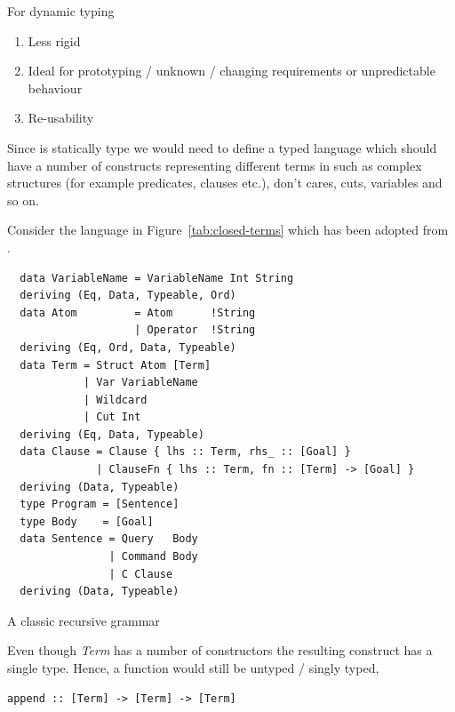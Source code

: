 \documentclass[thesis-solanki.tex]{subfiles}
\begin{document}
For dynamic typing
\begin{enumerate}
\item Less rigid
\item Ideal for prototyping / unknown / changing requirements or unpredictable behaviour
\item Re-usability
\end{enumerate}

Since  is statically type we would need to define a typed language which should have a
number of constructs representing different terms in  such as complex structures (for example
predicates, clauses etc.), don't cares, cuts, variables and so on.

Consider the language {in Figure~\ref{tab:closed-terms}} which has been adopted from
\cite{prolog-lib}.

\begin{code-list}
\begin{verbatim}
  data VariableName = VariableName Int String
  deriving (Eq, Data, Typeable, Ord)
  data Atom         = Atom      !String
                    | Operator  !String
  deriving (Eq, Ord, Data, Typeable)
  data Term = Struct Atom [Term]
            | Var VariableName
            | Wildcard
            | Cut Int
  deriving (Eq, Data, Typeable)
  data Clause = Clause { lhs :: Term, rhs_ :: [Goal] }
              | ClauseFn { lhs :: Term, fn :: [Term] -> [Goal] }
  deriving (Data, Typeable)
  type Program = [Sentence]
  type Body    = [Goal]
  data Sentence = Query   Body
                | Command Body
                | C Clause
  deriving (Data, Typeable)
\end{verbatim}
  \caption{A classic recursive grammar}
  \label{tab:closed-terms}
\end{code-list}

Even though \textit{Term} has a number of constructors the resulting construct has a single type. Hence, a function would still be untyped
/ singly typed,\par
\begin{verbatim}
append :: [Term] -> [Term] -> [Term]
\end{verbatim}

\end{document}

